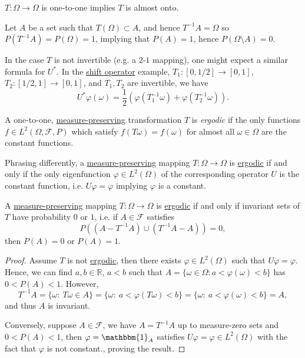 \begin{remark}
	\(T\colon \Omega \to \Omega\) is one-to-one implies \(T\) is almost onto.
\end{remark}
\begin{explanation}
	Let \(A\) be a set such that \(T(\Omega) \subset A\), and hence \(T^{-1} A = \Omega\) so \(P(T^{-1}A) = P(\Omega) = 1\), implying that \(P(A) = 1\), hence \(P(\Omega \setminus A) = 0\).
\end{explanation}

In the case \(T\) is not invertible (e.g. a \(2\)-\(1\) mapping), one might expect a similar formula for \(U^{\ast}\). In the \hyperref[eg:shift-op]{shift operator} example, \(T_1\colon [0, 1 / 2] \to [0,1]\), \(T_2\colon [1 / 2, 1] \to [0,1]\), and \(T_1, T_2\) are invertible, we have
\[
	U^{\ast} \varphi(\omega) = \frac{1}{2}\left( \varphi(T_1^{-1} \omega) + \varphi(T_2^{-1} \omega) \right) .
\]

\begin{definition}\label{def:ergodic-transformation}
	A one-to-one, \hyperref[def:measure-preserving]{measure-preserving} transformation \(T\) is \emph{ergodic} if the only functions \(f\in L^2 (\Omega , \mathcal{F} , P)\) which satisfy \(f(T \omega ) = f(\omega )\) for almost all \(\omega \in \Omega \) are the constant functions.
\end{definition}
\begin{remark}[Eigenfunction]
	Phrasing differently, a \hyperref[def:measure-preserving]{measure-preserving} mapping \(T\colon \Omega \to \Omega\) is \hyperref[def:ergodic-transformation]{ergodic} if and only if the only eigenfunction \(\varphi \in L^2(\Omega)\) of the corresponding operator \(U\) is the constant function, i.e. \(U \varphi = \varphi\) implying \(\varphi\) is a constant.
\end{remark}

\begin{lemma}
	A \hyperref[def:measure-preserving]{measure-preserving} mapping \(T\colon \Omega \to \Omega\) is \hyperref[def:ergodic-transformation]{ergodic} if and only if invariant sets of \(T\) have probability \(0\) or \(1\), i.e. if \(A \in \mathcal{F}\) satisfies
	\[
		P((A - T^{-1} A) \cup (T^{-1} A - A)) = 0,
	\]
	then \(P(A) = 0\) or \(P(A) = 1\).
\end{lemma}
\begin{proof}
	Assume \(T\) is not \hyperref[def:ergodic-transformation]{ergodic}, then there exists \(\varphi \in L^2(\Omega)\) such that \(U \varphi = \varphi\). Hence, we can find \(a,b \in \mathbb{R}\), \(a < b\) such that \(A = \{\omega \in \Omega\colon a < \varphi(\omega) < b\}\) has \(0 < P(A) < 1\). However,
	\[
		T^{-1}A  = \{\omega:\ T \omega \in A\}
		= \{\omega:\ a < \varphi(T \omega) < b\}
		= \{\omega:\ a < \varphi(\omega) < b\} = A,
	\]
	and thus \(A\) is invariant.

	Conversely, suppose \(A \in \mathcal{F}\), we have \(A = T^{-1}A\) up to measure-zero sets and \(0 < P(A) < 1\), then \(\varphi = \mathbbm{1}_A\) satisfies \(U \varphi = \varphi \in L^2(\Omega)\) with the fact that \(\varphi\) is not constant., proving the result.
\end{proof}

